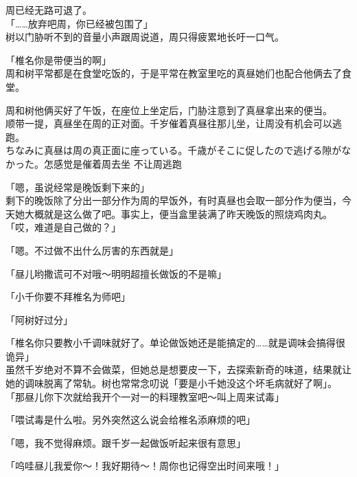 周已经无路可退了。\\

「……放弃吧周，你已经被包围了」\\

树以门胁听不到的音量小声跟周说道，周只得疲累地长吁一口气。\\

\vspace{2\baselineskip}

「椎名你是带便当的啊」\\

周和树平常都是在食堂吃饭的，于是平常在教室里吃的真昼她们也配合他俩去了食堂。

周和树他俩买好了午饭，在座位上坐定后，门胁注意到了真昼拿出来的便当。\\

顺带一提，真昼坐在周的正对面。千岁催着真昼往那儿坐，让周没有机会可以逃跑。\\ちなみに真昼は周の真正面に座っている。千歳がそこに促したので逃げる隙がなかった。怎感觉是催着周去坐 不让周逃跑

「嗯，虽说经常是晚饭剩下来的」\\

剩下的晚饭除了分出一部分作为周的早饭外，有时真昼也会取一部分作为便当，今天她大概就是这么做了吧。事实上，便当盒里装满了昨天晚饭的照烧鸡肉丸。\\

「哎，难道是自己做的？」

「嗯。不过做不出什么厉害的东西就是」

「昼儿哟撒谎可不对哦～明明超擅长做饭的不是嘛」

「小千你要不拜椎名为师吧」

「阿树好过分」

「椎名你只要教小千调味就好了。单论做饭她还是能搞定的……就是调味会搞得很诡异」\\

虽然千岁绝对不算不会做菜，但她总是想要皮一下，去探索新奇的味道，结果就让她的调味脱离了常轨。树也常常念叨说「要是小千她没这个坏毛病就好了啊」。\\

「那昼儿你下次就给我开个一对一的料理教室吧～叫上周来试毒」

「喂试毒是什么啦。另外突然这么说会给椎名添麻烦的吧」

「嗯，我不觉得麻烦。跟千岁一起做饭听起来很有意思」

「呜哇昼儿我爱你～！我好期待～！周你也记得空出时间来哦！」\\

